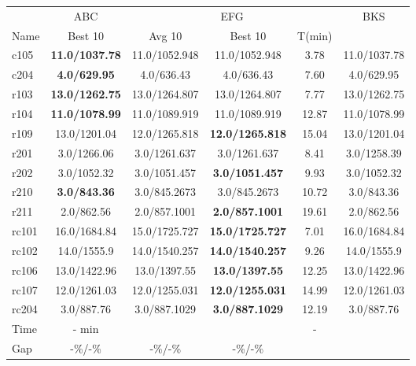\begin{tabular}{lccccc}
		\toprule
		& ABC & \multicolumn{3}{c}{EFG} & {BKS} \\
		\cmidrule(lr{1em}){2-2}\cmidrule(lr{1em}){3-5}
		Name & Best 10 & Avg 10 & Best 10 & T(min) &  \\
		\midrule
		c105 & \textbf{11.0/1037.78} & 11.0/1052.948 & 11.0/1052.948 & 3.78 & 11.0/1037.78 \\
		c204 & \textbf{4.0/629.95} & 4.0/636.43 & 4.0/636.43 & 7.60 & 4.0/629.95 \\
		r103 & \textbf{13.0/1262.75} & 13.0/1264.807 & 13.0/1264.807 & 7.77 & 13.0/1262.75 \\
		r104 & \textbf{11.0/1078.99} & 11.0/1089.919 & 11.0/1089.919 & 12.87 & 11.0/1078.99 \\
		r109 & 13.0/1201.04 & 12.0/1265.818 & \textbf{12.0/1265.818} & 15.04 & 13.0/1201.04 \\
		r201 & 3.0/1266.06 & 3.0/1261.637 & 3.0/1261.637 & 8.41 & 3.0/1258.39 \\
		r202 & 3.0/1052.32 & 3.0/1051.457 & \textbf{3.0/1051.457} & 9.93 & 3.0/1052.32 \\
		r210 & \textbf{3.0/843.36} & 3.0/845.2673 & 3.0/845.2673 & 10.72 & 3.0/843.36 \\
		r211 & 2.0/862.56 & 2.0/857.1001 & \textbf{2.0/857.1001} & 19.61 & 2.0/862.56 \\
		rc101 & 16.0/1684.84 & 15.0/1725.727 & \textbf{15.0/1725.727} & 7.01 & 16.0/1684.84 \\
		rc102 & 14.0/1555.9 & 14.0/1540.257 & \textbf{14.0/1540.257} & 9.26 & 14.0/1555.9 \\
		rc106 & 13.0/1422.96 & 13.0/1397.55 & \textbf{13.0/1397.55} & 12.25 & 13.0/1422.96 \\
		rc107 & 12.0/1261.03 & 12.0/1255.031 & \textbf{12.0/1255.031} & 14.99 & 12.0/1261.03 \\
		rc204 & 3.0/887.76 & 3.0/887.1029 & \textbf{3.0/887.1029} & 12.19 & 3.0/887.76 \\
		\midrule
		Time & - min &  &  & - &  \\
		Gap & -\%/-\% & -\%/-\% & -\%/-\% &  &  \\
		\bottomrule
	\end{tabular}